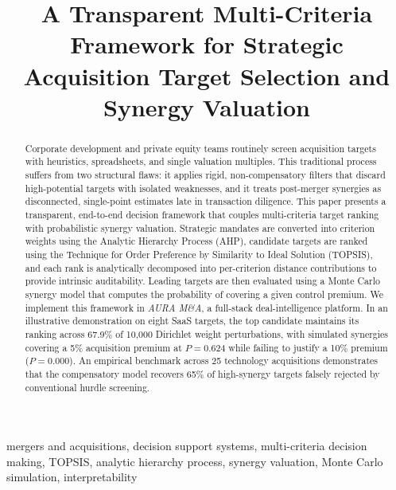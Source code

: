 \documentclass[conference]{IEEEtran}
\begin{document}
\title{A Transparent Multi-Criteria Framework for Strategic Acquisition Target Selection and Synergy Valuation}

\author{
}

\maketitle

\begin{abstract}
Corporate development and private equity teams routinely screen acquisition targets with heuristics, spreadsheets, and single valuation multiples. This traditional process suffers from two structural flaws: it applies rigid, non-compensatory filters that discard high-potential targets with isolated weaknesses, and it treats post-merger synergies as disconnected, single-point estimates late in transaction diligence. This paper presents a transparent, end-to-end decision framework that couples multi-criteria target ranking with probabilistic synergy valuation. Strategic mandates are converted into criterion weights using the Analytic Hierarchy Process (AHP), candidate targets are ranked using the Technique for Order Preference by Similarity to Ideal Solution (TOPSIS), and each rank is analytically decomposed into per-criterion distance contributions to provide intrinsic auditability. Leading targets are then evaluated using a Monte Carlo synergy model that computes the probability of covering a given control premium. We implement this framework in \textit{AURA M\&A}, a full-stack deal-intelligence platform. In an illustrative demonstration on eight SaaS targets, the top candidate maintains its ranking across 67.9\% of 10,000 Dirichlet weight perturbations, with simulated synergies covering a 5\% acquisition premium at $P=0.624$ while failing to justify a 10\% premium ($P=0.000$). An empirical benchmark across 25 technology acquisitions demonstrates that the compensatory model recovers 65\% of high-synergy targets falsely rejected by conventional hurdle screening.
\end{abstract}

\begin{IEEEkeywords}
mergers and acquisitions, decision support systems, multi-criteria decision making, TOPSIS, analytic hierarchy process, synergy valuation, Monte Carlo simulation, interpretability
\end{IEEEkeywords}
\end{document}
